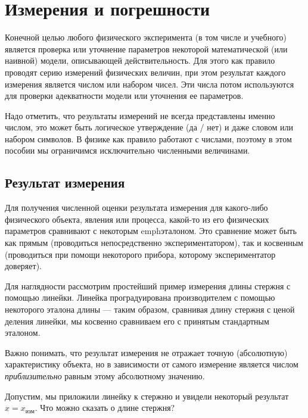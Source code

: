 \chapter{Измерения и погрешности}


Конечной целью любого физического эксперимента (в том числе и учебного) является проверка или уточнение параметров некоторой математической (или наивной) модели, описывающей действительность. Для этого как правило проводят серию измерений физических величин, при этом результат каждого измерения является числом или набором чисел. Эти числа потом используются для проверки адекватности модели или уточнения ее параметров.

Надо отметить, что результаты измерений не всегда представлены именно числом, это может быть логическое утверждение (да / нет) и даже словом или набором символов. В физике как правило работают с числами, поэтому в этом пособии мы ограничимся исключительно численными величинами.

\section{Результат измерения}

Для получения численной оценки результата измерения для какого-либо физического объекта, явления или процесса, какой-то из его физических параметров сравнивают с некоторым emph{эталоном}. Это сравнение может быть как прямым (проводиться непосредственно экспериментатором), так и косвенным (проводиться при помощи некоторого прибора, которому экспериментатор доверяет).

Для наглядности рассмотрим простейший пример измерения длины стержня
с помощью линейки. Линейка проградуирована производителем с помощью
некоторого эталона длины --- таким образом, сравнивая длину
стержня с ценой деления линейки, мы косвенно сравниваем его с принятым
стандартным эталоном. 

Важно понимать, что результат измерения не отражает точную (абсолютную) характеристику объекта, но в зависимости от самого измерение является числом \emph{приблизительно} равным этому абсолютному значению. 

Допустим, мы приложили линейку к стержню и увидели некоторый результат
$x=x_{\text{изм}}$. Что можно сказать о длине стержня?

